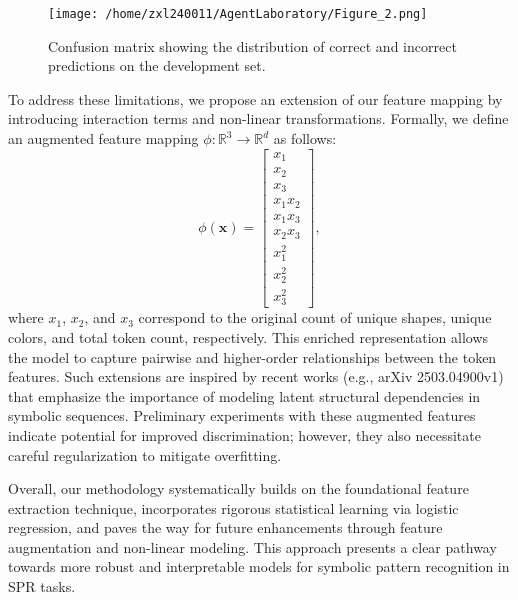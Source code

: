 \documentclass{article}
\begin{document}
\begin{figure}[h]
\caption{Confusion matrix showing the distribution of correct and incorrect predictions on the development set.}
\centering
\texttt{[image: /home/zxl240011/AgentLaboratory/Figure\_2.png]}
\label{fig:fig2}
\end{figure}

To address these limitations, we propose an extension of our feature mapping by introducing interaction terms and non-linear transformations. Formally, we define an augmented feature mapping \(\phi: \mathbb{R}^3 \to \mathbb{R}^{d}\) as follows:
\[
\phi(\mathbf{x}) = \begin{bmatrix} x_1 \\ x_2 \\ x_3 \\ x_1 x_2 \\ x_1 x_3 \\ x_2 x_3 \\ x_1^2 \\ x_2^2 \\ x_3^2 \end{bmatrix},
\]
where \(x_1\), \(x_2\), and \(x_3\) correspond to the original count of unique shapes, unique colors, and total token count, respectively. This enriched representation allows the model to capture pairwise and higher-order relationships between the token features. Such extensions are inspired by recent works (e.g., arXiv 2503.04900v1) that emphasize the importance of modeling latent structural dependencies in symbolic sequences. Preliminary experiments with these augmented features indicate potential for improved discrimination; however, they also necessitate careful regularization to mitigate overfitting.

Overall, our methodology systematically builds on the foundational feature extraction technique, incorporates rigorous statistical learning via logistic regression, and paves the way for future enhancements through feature augmentation and non-linear modeling. This approach presents a clear pathway towards more robust and interpretable models for symbolic pattern recognition in SPR tasks.
\end{document}
